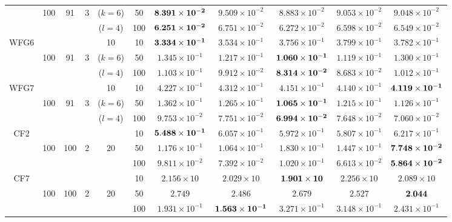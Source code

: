 \documentclass[../main/main]{subfiles}
\begin{document}
\begin{table}[htbp]
\begin{tabular}{c|ccccc|c|c|c|c|c}
  				   & 100 & 91 & 3 & ($k=6$) & 50 &$\bf{8.391 \times 10^{-2}}$ & $9.509 \times 10^{-2}$ & $8.883 \times 10^{-2}$ & $9.053 \times 10^{-2}$ & $9.048 \times 10^{-2}$\\
				   &        &     && ($l=4$)  &100 &$\bf{6.251 \times 10^{-2}}$ & $6.751 \times 10^{-2}$ & $6.272 \times 10^{-2}$ & $6.598 \times 10^{-2}$ & $6.549 \times 10^{-2}$\\
\hline
\multirow{3}{*}{WFG6} &        &  &&  10   & 10 &$\bf{3.334 \times 10^{-1}}$ & $3.534 \times 10^{-1}$ & $3.756 \times 10^{-1}$ & $3.799 \times 10^{-1}$ & $3.782 \times 10^{-1}$\\
  				   & 100 & 91 & 3 & ($k=6$) & 50  &$1.345 \times 10^{-1}$ & $1.217 \times 10^{-1}$ & $\bf{1.060 \times 10^{-1}}$ & $1.119 \times 10^{-1}$ & $1.300 \times 10^{-1}$\\
				   &        &      && ($l=4$) &100  &$1.103 \times 10^{-1}$ & $9.912 \times 10^{-2}$ & $\bf{8.314 \times 10^{-2}}$ & $8.683 \times 10^{-2}$ & $1.012 \times 10^{-1}$\\
\hline
\multirow{3}{*}{WFG7} &        &   &&  10  & 10 &$4.227 \times 10^{-1}$ & $4.312 \times 10^{-1}$ & $4.151 \times 10^{-1}$ & $4.140 \times 10^{-1}$ & $\bf{4.119 \times 10^{-1}}$\\
  				   & 100 & 91 & 3 & ($k=6$) &50 &$1.362 \times 10^{-1}$ & $1.265 \times 10^{-1}$ & $\bf{1.065 \times 10^{-1}}$ & $1.215 \times 10^{-1}$ & $1.126 \times 10^{-1}$\\
				   &        &       && ($l=4$) &100 &$9.753 \times 10^{-2}$ & $7.751 \times 10^{-2}$ & $\bf{6.994 \times 10^{-2}}$ & $7.648 \times 10^{-2}$ & $7.060 \times 10^{-2}$\\
\hline
\multirow{3}{*}{CF2}&        &     &&  & 10 &$\bf{5.488 \times 10^{-1}}$ & $6.057 \times 10^{-1}$ & $5.972 \times 10^{-1}$ & $5.807 \times 10^{-1}$ & $6.217 \times 10^{-1}$\\
  				   & 100 & 100 &2 & 20 & 50 &$1.176 \times 10^{-1}$ & $1.064 \times 10^{-1}$ & $1.830 \times 10^{-1}$ & $1.447 \times 10^{-1}$ & $\bf{7.748 \times 10^{-2}}$\\
				   &        &     &&   &100 &$9.811 \times 10^{-2}$ & $7.392 \times 10^{-2}$ & $1.020 \times 10^{-1}$ & $6.613 \times 10^{-2}$ & $\bf{5.864 \times 10^{-2}}$\\
\hline
\multirow{3}{*}{CF7} &        &    &&   & 10 &$2.156 \times 10$ & $2.029 \times 10$ & $\bf{1.901 \times 10}$ & $2.256 \times 10$ & $2.089 \times 10$\\
  				   & 100 & 100 &2 & 20 &50 &$2.749$ & $2.486$ & $2.679$ & $2.527$ & $\bf{2.044}$\\
				   &        &     &&   &100 &$1.931 \times 10^{-1}$ & $\bf{1.563 \times 10^{-1}}$ & $3.271 \times 10^{-1}$ & $3.148 \times 10^{-1}$ & $2.431 \times 10^{-1}$\\


\end{tabular}
\end{table}
\end{document}
